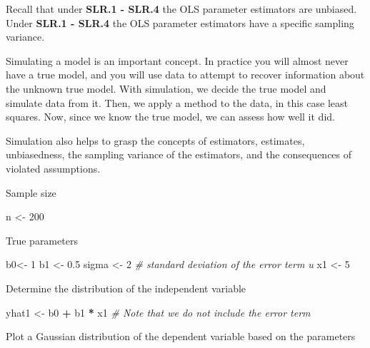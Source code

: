 \documentclass[]{book}
\newenvironment{Shaded}{\begin{snugshade}}{\end{snugshade}}
\newcommand{\CommentTok}[1]{\textcolor[rgb]{0.56,0.35,0.01}{\textit{#1}}}
\newcommand{\DecValTok}[1]{\textcolor[rgb]{0.00,0.00,0.81}{#1}}
\newcommand{\FloatTok}[1]{\textcolor[rgb]{0.00,0.00,0.81}{#1}}
\newcommand{\NormalTok}[1]{#1}
\newcommand{\OperatorTok}[1]{\textcolor[rgb]{0.81,0.36,0.00}{\textbf{#1}}}
\newcommand{\StringTok}[1]{\textcolor[rgb]{0.31,0.60,0.02}{#1}}
\begin{document}
Recall that under \textbf{SLR.1 - SLR.4} the OLS parameter estimators
are unbiased. Under \textbf{SLR.1 - SLR.4} the OLS parameter estimators
have a specific sampling variance.

Simulating a model is an important concept. In practice you will almost
never have a true model, and you will use data to attempt to recover
information about the unknown true model. With simulation, we decide the
true model and simulate data from it. Then, we apply a method to the
data, in this case least squares. Now, since we know the true model, we
can assess how well it did.

Simulation also helps to grasp the concepts of estimators, estimates,
unbiasedness, the sampling variance of the estimators, and the
consequences of violated assumptions.

Sample size

\begin{Shaded}
\begin{Highlighting}[]
\NormalTok{n <-}\StringTok{ }\DecValTok{200}
\end{Highlighting}
\end{Shaded}

True parameters

\begin{Shaded}
\begin{Highlighting}[]
\NormalTok{b0<-}\StringTok{ }\DecValTok{1}
\NormalTok{b1 <-}\StringTok{ }\FloatTok{0.5}
\NormalTok{sigma <-}\StringTok{ }\DecValTok{2} \CommentTok{# standard deviation of the error term u }
\NormalTok{x1 <-}\StringTok{ }\DecValTok{5}
\end{Highlighting}
\end{Shaded}

Determine the distribution of the independent variable

\begin{Shaded}
\begin{Highlighting}[]
\NormalTok{yhat1 <-}\StringTok{ }\NormalTok{b0 }\OperatorTok{+}\StringTok{ }\NormalTok{b1 }\OperatorTok{*}\StringTok{ }\NormalTok{x1 }\CommentTok{#  Note that we do not include the error term }
\end{Highlighting}
\end{Shaded}

Plot a Gaussian distribution of the dependent variable based on the
parameters
\end{document}
